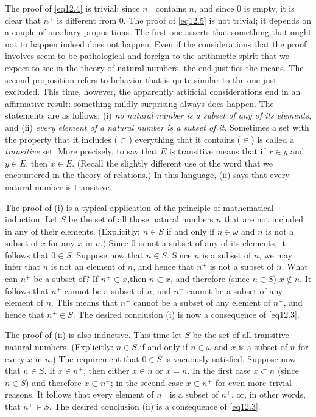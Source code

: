 The proof of \eqref{eq12.4} is trivial; since $n^{+}$ contains $n$, and since $0$ is empty, it is clear that $n^{+}$ is different from $0$. The proof of \eqref{eq12.5} is not trivial; it depends on a couple of auxiliary propositions. The first one asserts that something that ought not to happen indeed does not happen. Even if the considerations that the proof involves seem to be pathological and foreign to the arithmetic spirit that we expect to see in the theory of natural numbers, the end justifies the means. The second proposition refers to behavior that is quite similar to the one just excluded. This time, however, the apparently artificial considerations end in an affirmative result: something mildly surprising always does happen. The statements are as follows: (i) \textit{no natural number is a subset of any of its elements}, and  (ii) \textit{every element of a natural number is a subset of it}. Sometimes a set with the property that it includes ($\subset$) everything that it contains ($\in$) is called a \textit{transitive} set. More precisely, to say that $E$ is transitive means that if $x \in y$ and $y \in E$, then $x \in E$. (Recall the slightly different use of the word that we encountered in the theory of relations.) In this language, (ii) says that every natural number is transitive. 

The proof of (i) is a typical application of the principle of mathematical induction. Let $S$ be the set of all those natural numbers $n$ that are not included in any of their elements. (Explicitly: $n \in S$ if and only if $n \in \omega$ and $n$ is not a subset of $x$ for any $x$ in $n$.) Since $0$ is not a subset of any of its elements, it follows that $0 \in S$.  Suppose now that $n \in S$. Since $n$ is a subset of $n$, we may infer that $n$ is not an element of $n$, and hence that $n^{+}$ is not a subset of $n$. What can $n^{+}$ be a subset of? If $n^{+} \subset x$,then $n \subset x$, and therefore (since $n \in S$) $x \notin n$. It follows that $n^{+}$ cannot be a subset of $n$, and $n^{+}$ cannot be a subset of any element of $n$. This means that $n^{+}$ cannot be a subset of any element of $n^{+}$, and hence that $n^{+} \in S$. The desired conclusion (i) is now a consequence of \eqref{eq12.3}. 

The proof of (ii) is also inductive. This time let $S$ be the set of all transitive natural numbers. (Explicitly: $n \in S$ if and only if $n \in \omega$ and $x$ is a subset of $n$ for every $x$ in $n$.) The requirement that $0 \in S$ is vacuously satisfied.  Suppose now that $n \in S$. If $x \in n^{+}$, then either $x \in n$ or $x = n$. In the first case $x \subset n$ (since $n \in S$) and therefore $x \subset n^{+}$; in the second case $x \subset n^{+}$ for even more trivial reasons. It follows that every element of $n^{+}$ is a subset of $n^{+}$, or, in other words, that $n^{+} \in S$. The desired conclusion (ii) is a consequence of \eqref{eq12.3}. 

